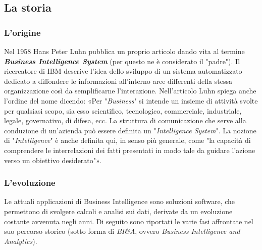 \subsection{La storia}

\subsubsection{L'origine}

Nel 1958 Hans Peter Luhn pubblica un proprio articolo dando vita al termine \textit{\textbf{Business Intelligence System}} (per questo ne è considerato il "padre"). Il ricercatore di IBM descrive l'idea dello sviluppo di un sistema automatizzato dedicato a diffondere le informazioni all'interno aree differenti della stessa organizzazione così da semplificarne l'interazione. Nell'articolo Luhn spiega anche l'ordine del nome dicendo: «Per "\textit{Business}" si intende un insieme di attività svolte per qualsiasi scopo, sia esso scientifico, tecnologico, commerciale, industriale, legale, governativo, di difesa, ecc. La struttura di comunicazione che serve alla conduzione di un'azienda può essere definita un "\textit{Intelligence System}". La nozione di "\textit{Intelligence}" è anche definita qui, in senso più generale, come "la capacità di comprendere le interrelazioni dei fatti presentati in modo tale da guidare l'azione verso un obiettivo desiderato"».\cite{luhn_business_intelligence}

\subsubsection{L'evoluzione}

Le attuali applicazioni di Business Intelligence sono soluzioni software, che permettono di svolgere calcoli e analisi sui dati, derivate da un evoluzione costante avvenuta negli anni. Di seguito sono riportati le varie fasi affrontate nel suo percorso storico (sotto forma di \textit{BI\&A}, ovvero \textit{Business Intelligence and Analytics}).\cite{researchgate_bi_and_ba}

